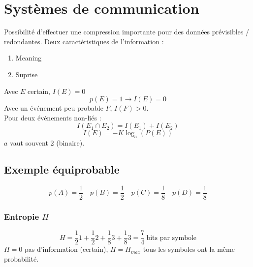 \documentclass[resume]{subfiles}
\begin{document}
\section{Systèmes de communication}
Possibilité d'effectuer une compression importante pour des données prévisibles / redondantes. Deux caractéristiques de l'information :
\begin{enumerate}
\item Meaning
\item Suprise
\end{enumerate}
Avec $E$ certain, $I(E)=0$
$$p(E)=1\longrightarrow I(E)=0$$
Avec un événement peu probable $F$, $I(F)>0$.\\
Pour deux événements non-liés :
$$I(E_1\cap E_2)=I(E_1)+I(E_2)$$
$$\boxed{I(E)=-K\log_{a}(P(E))}$$
$a$ vaut souvent 2 (binaire).
\subsection{Exemple équiprobable}
$$p(A)=\frac{1}{2}\quad p(B)=\frac{1}{2}\quad p(C)=\frac{1}{8}\quad p(D)=\frac{1}{8}$$
\subsubsection{Entropie $H$}
$$H=\frac{1}{2}1+\frac{1}{2}2+\frac{1}{8}3+\frac{1}{8}3=\frac{7}{4}\ \text{bits par symbole}$$
$H=0$ pas d'information (certain), $H=H_{max}$ tous les symboles ont la même probabilité.
\end{document}
